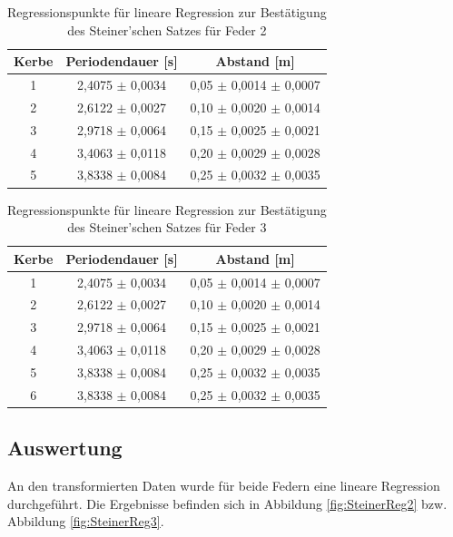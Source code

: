 \documentclass[12pt,a4paper]{article}
\begin{document}
\begin{table}
\caption{Regressionspunkte für lineare Regression zur Bestätigung des Steiner'schen Satzes für Feder 2}
\label{tab:linReg_Punkte_Steiner_Feder2}
\begin{center}
\begin{tabular}{|c|c|c|}
\hline 
Kerbe & Periodendauer [s] & Abstand [m] \\ 
\hline 
1 & 2,4075 $\pm$ 0,0034 & 0,05 $\pm$ 0,0014 $\pm$ 0,0007 \\ 
\hline 
2 & 2,6122 $\pm$ 0,0027 & 0,10 $\pm$ 0,0020 $\pm$ 0,0014 \\ 
\hline 
3 & 2,9718 $\pm$ 0,0064 & 0,15 $\pm$ 0,0025 $\pm$ 0,0021 \\ 
\hline 
4 & 3,4063 $\pm$ 0,0118 & 0,20 $\pm$ 0,0029 $\pm$ 0,0028 \\ 
\hline 
5 & 3,8338 $\pm$ 0,0084 & 0,25 $\pm$ 0,0032 $\pm$ 0,0035 \\ 
\hline 
\end{tabular} 
\end{center}
\end{table}

\begin{table}
\caption{Regressionspunkte für lineare Regression zur Bestätigung des Steiner'schen Satzes für Feder 3}
\label{tab:linReg_Punkte_Steiner_Feder3}
\begin{center}
\begin{tabular}{|c|c|c|}
\hline 
Kerbe & Periodendauer [s] & Abstand [m] \\ 
\hline 
1 & 2,4075 $\pm$ 0,0034 & 0,05 $\pm$ 0,0014 $\pm$ 0,0007 \\ 
\hline 
2 & 2,6122 $\pm$ 0,0027 & 0,10 $\pm$ 0,0020 $\pm$ 0,0014 \\ 
\hline 
3 & 2,9718 $\pm$ 0,0064 & 0,15 $\pm$ 0,0025 $\pm$ 0,0021 \\ 
\hline 
4 & 3,4063 $\pm$ 0,0118 & 0,20 $\pm$ 0,0029 $\pm$ 0,0028 \\ 
\hline 
5 & 3,8338 $\pm$ 0,0084 & 0,25 $\pm$ 0,0032 $\pm$ 0,0035 \\ 
\hline 
6 & 3,8338 $\pm$ 0,0084 & 0,25 $\pm$ 0,0032 $\pm$ 0,0035 \\ 
\hline
\end{tabular} 
\end{center}
\end{table}

\subsection{Auswertung}
An den transformierten Daten wurde für beide Federn eine lineare Regression durchgeführt. Die Ergebnisse befinden sich in Abbildung \ref{fig:SteinerReg2} bzw. Abbildung \ref{fig:SteinerReg3}.
\end{document}
